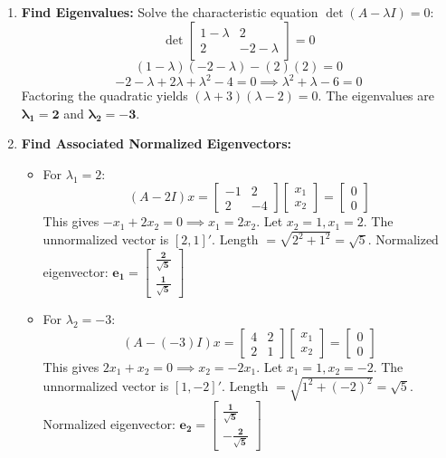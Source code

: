 \documentclass[11pt,letterpaper]{article}
\begin{document}
\begin{enumerate}
    \item[(1)] \textbf{Find Eigenvalues:} 
    Solve the characteristic equation $\det(A - \lambda I) = 0$:
    $$\det \begin{bmatrix} 1 - \lambda & 2 \\ 2 & -2 - \lambda \end{bmatrix} = 0$$
    $$(1 - \lambda)(-2 - \lambda) - (2)(2) = 0$$
    $$-2 - \lambda + 2\lambda + \lambda^2 - 4 = 0 \implies \lambda^2 + \lambda - 6 = 0$$
    Factoring the quadratic yields $(\lambda + 3)(\lambda - 2) = 0$. 
    The eigenvalues are $\mathbf{\lambda_1 = 2}$ and $\mathbf{\lambda_2 = -3}$.

    \item[(2)] \textbf{Find Associated Normalized Eigenvectors:}
    \begin{itemize}
        \item For $\lambda_1 = 2$: 
        $$(A - 2I)x = \begin{bmatrix} -1 & 2 \\ 2 & -4 \end{bmatrix} \begin{bmatrix} x_1 \\ x_2 \end{bmatrix} = \begin{bmatrix} 0 \\ 0 \end{bmatrix}$$
        This gives $-x_1 + 2x_2 = 0 \implies x_1 = 2x_2$. Let $x_2=1, x_1=2$. The unnormalized vector is $[2, 1]'$.
        Length $= \sqrt{2^2 + 1^2} = \sqrt{5}$. 
        Normalized eigenvector: $\mathbf{e_1 = \begin{bmatrix} \frac{2}{\sqrt{5}} \\ \frac{1}{\sqrt{5}} \end{bmatrix}}$

        \item For $\lambda_2 = -3$: 
        $$(A - (-3)I)x = \begin{bmatrix} 4 & 2 \\ 2 & 1 \end{bmatrix} \begin{bmatrix} x_1 \\ x_2 \end{bmatrix} = \begin{bmatrix} 0 \\ 0 \end{bmatrix}$$
        This gives $2x_1 + x_2 = 0 \implies x_2 = -2x_1$. Let $x_1=1, x_2=-2$. The unnormalized vector is $[1, -2]'$.
        Length $= \sqrt{1^2 + (-2)^2} = \sqrt{5}$.
        Normalized eigenvector: $\mathbf{e_2 = \begin{bmatrix} \frac{1}{\sqrt{5}} \\ -\frac{2}{\sqrt{5}} \end{bmatrix}}$
    \end{itemize}


\end{enumerate}
\end{document}
